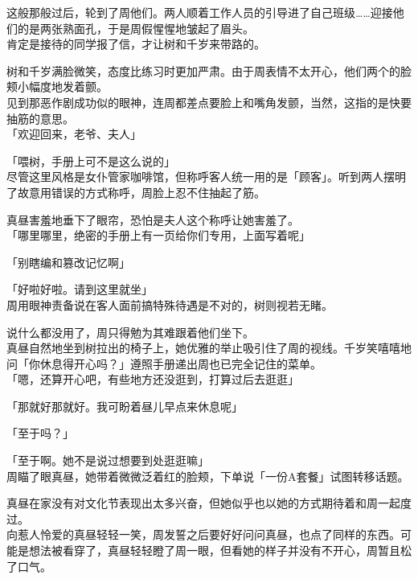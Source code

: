 \vspace{2\baselineskip}

这般那般过后，轮到了周他们。两人顺着工作人员的引导进了自己班级……迎接他们的是两张熟面孔，于是周假惺惺地皱起了眉头。\\

肯定是接待的同学报了信，才让树和千岁来带路的。

树和千岁满脸微笑，态度比练习时更加严肃。由于周表情不太开心，他们两个的脸颊小幅度地发着颤。\\

见到那恶作剧成功似的眼神，连周都差点要脸上和嘴角发颤，当然，这指的是快要抽筋的意思。\\

「欢迎回来，老爷、夫人」

「喂树，手册上可不是这么说的」\\

尽管这里风格是女仆管家咖啡馆，但称呼客人统一用的是「顾客」。听到两人摆明了故意用错误的方式称呼，周脸上忍不住抽起了筋。

真昼害羞地垂下了眼帘，恐怕是夫人这个称呼让她害羞了。\\

「哪里哪里，绝密的手册上有一页给你们专用，上面写着呢」

「别瞎编和篡改记忆啊」

「好啦好啦。请到这里就坐」\\

周用眼神责备说在客人面前搞特殊待遇是不对的，树则视若无睹。

说什么都没用了，周只得勉为其难跟着他们坐下。\\

真昼自然地坐到树拉出的椅子上，她优雅的举止吸引住了周的视线。千岁笑嘻嘻地问「你休息得开心吗？」遵照手册递出周也已完全记住的菜单。\\

「嗯，还算开心吧，有些地方还没逛到，打算过后去逛逛」

「那就好那就好。我可盼着昼儿早点来休息呢」

「至于吗？」

「至于啊。她不是说过想要到处逛逛嘛」\\

周瞄了眼真昼，她带着微微泛着红的脸颊，下单说「一份A套餐」试图转移话题。

真昼在家没有对文化节表现出太多兴奋，但她似乎也以她的方式期待着和周一起度过。\\

向惹人怜爱的真昼轻轻一笑，周发誓之后要好好问问真昼，也点了同样的东西。可能是想法被看穿了，真昼轻轻瞪了周一眼，但看她的样子并没有不开心，周暂且松了口气。\\

